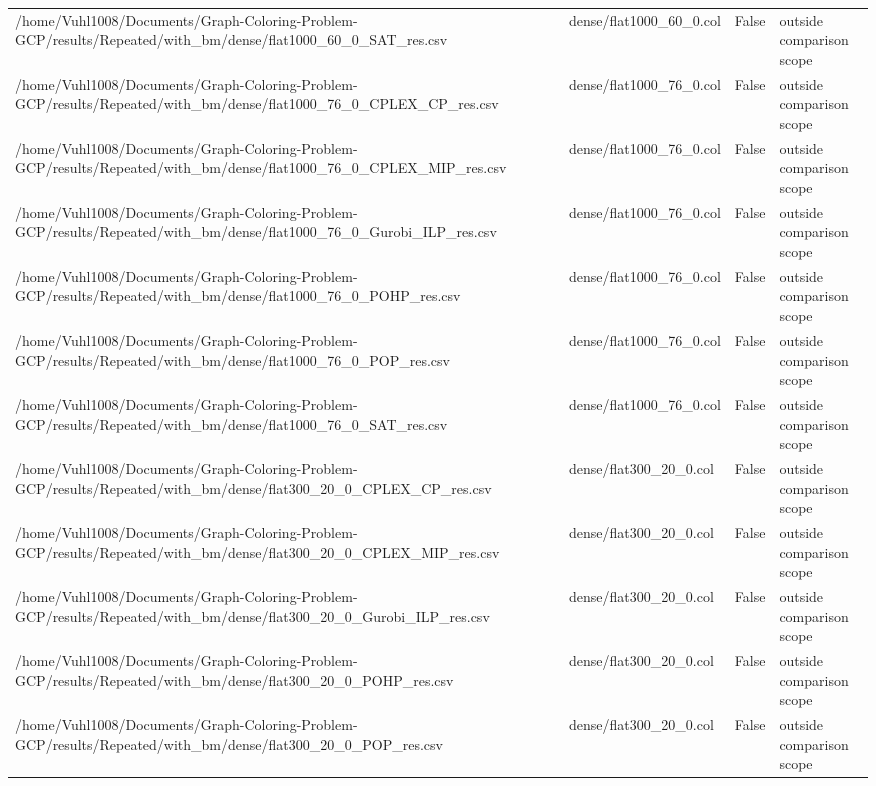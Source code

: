 \begin{table}[htbp]
\begin{tabular}{llll}
/home/Vuhl1008/Documents/Graph-Coloring-Problem-GCP/results/Repeated/with\_bm/dense/flat1000\_60\_0\_SAT\_res.csv & dense/flat1000\_60\_0.col & False & outside comparison scope \\
/home/Vuhl1008/Documents/Graph-Coloring-Problem-GCP/results/Repeated/with\_bm/dense/flat1000\_76\_0\_CPLEX\_CP\_res.csv & dense/flat1000\_76\_0.col & False & outside comparison scope \\
/home/Vuhl1008/Documents/Graph-Coloring-Problem-GCP/results/Repeated/with\_bm/dense/flat1000\_76\_0\_CPLEX\_MIP\_res.csv & dense/flat1000\_76\_0.col & False & outside comparison scope \\
/home/Vuhl1008/Documents/Graph-Coloring-Problem-GCP/results/Repeated/with\_bm/dense/flat1000\_76\_0\_Gurobi\_ILP\_res.csv & dense/flat1000\_76\_0.col & False & outside comparison scope \\
/home/Vuhl1008/Documents/Graph-Coloring-Problem-GCP/results/Repeated/with\_bm/dense/flat1000\_76\_0\_POHP\_res.csv & dense/flat1000\_76\_0.col & False & outside comparison scope \\
/home/Vuhl1008/Documents/Graph-Coloring-Problem-GCP/results/Repeated/with\_bm/dense/flat1000\_76\_0\_POP\_res.csv & dense/flat1000\_76\_0.col & False & outside comparison scope \\
/home/Vuhl1008/Documents/Graph-Coloring-Problem-GCP/results/Repeated/with\_bm/dense/flat1000\_76\_0\_SAT\_res.csv & dense/flat1000\_76\_0.col & False & outside comparison scope \\
/home/Vuhl1008/Documents/Graph-Coloring-Problem-GCP/results/Repeated/with\_bm/dense/flat300\_20\_0\_CPLEX\_CP\_res.csv & dense/flat300\_20\_0.col & False & outside comparison scope \\
/home/Vuhl1008/Documents/Graph-Coloring-Problem-GCP/results/Repeated/with\_bm/dense/flat300\_20\_0\_CPLEX\_MIP\_res.csv & dense/flat300\_20\_0.col & False & outside comparison scope \\
/home/Vuhl1008/Documents/Graph-Coloring-Problem-GCP/results/Repeated/with\_bm/dense/flat300\_20\_0\_Gurobi\_ILP\_res.csv & dense/flat300\_20\_0.col & False & outside comparison scope \\
/home/Vuhl1008/Documents/Graph-Coloring-Problem-GCP/results/Repeated/with\_bm/dense/flat300\_20\_0\_POHP\_res.csv & dense/flat300\_20\_0.col & False & outside comparison scope \\
/home/Vuhl1008/Documents/Graph-Coloring-Problem-GCP/results/Repeated/with\_bm/dense/flat300\_20\_0\_POP\_res.csv & dense/flat300\_20\_0.col & False & outside comparison scope \\

\end{tabular}
\end{table}
